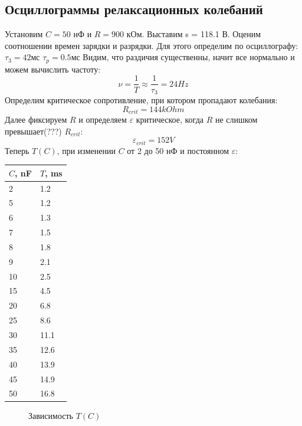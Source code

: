\documentclass[a4paper,12pt]{article}
\begin{document}
\subsection*{Осциллограммы релаксационных колебаний}
Установим $C = 50$ нФ и $R = 900$ кОм. Выставим s = 118.1 В. 
Оценим соотношении времен зарядки и разрядки. Для этого определим по осциллографу: 
$\tau_3 = 42$мс
$\tau_p = 0.5$мс
Видим, что раздичия существенны, начит все нормально и можем вычислить частоту:
$$
\nu = \frac{1}{T} \approx \frac{1}{\tau_3} = 24 Hz
$$
Определим критическое сопротивление, при котором пропадают колебания:
$$
R_{crit} = 144 kOhm
$$
Далее фиксируем $R$ и определяем $\varepsilon$ критическое, когда $R$ не слишком превышает(???) $R_{crit}$:
$$
\varepsilon_{crit} = 152 V
$$
Теперь $T(C)$, при изменении $C$ от 2 до 50 нФ и постоянном $\varepsilon$:
\begin{table}[h]
\centering
\begin{tabular}{|l|l|}
\hline
$C$, nF & $T$, ms     \\ \hline
 2 &   1.2  \\ \hline
 5 &  1.2   \\ \hline
 6 &  1.3   \\ \hline
 7 &  1.5   \\ \hline
 8 &   1.8  \\ \hline
 9 &   2.1  \\ \hline
 10 &  2.5   \\ \hline
 15 &  4.5   \\ \hline
 20 &   6.8  \\ \hline
 25 &  8.6   \\ \hline
 30 &  11.1   \\ \hline
 35 &   12.6  \\ \hline
 40 &   13.9  \\ \hline
 45 &    14.9 \\ \hline
 50 &    16.8 \\ \hline
\end{tabular}
\end{table}
\begin{figure}[h]
\caption{Зависимость $T(C)$}
\label{fig:relation2}
\end{figure}
\end{document}
